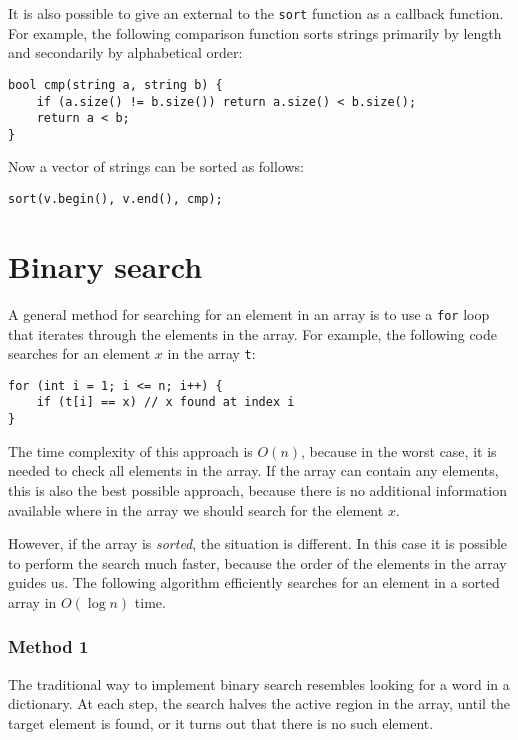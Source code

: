 
It is also possible to give an external
 to the \texttt{sort} function
as a callback function.
For example, the following comparison function
sorts strings primarily by length and secondarily
by alphabetical order:

\begin{lstlisting}
bool cmp(string a, string b) {
    if (a.size() != b.size()) return a.size() < b.size();
    return a < b;
}
\end{lstlisting}
Now a vector of strings can be sorted as follows:
\begin{lstlisting}
sort(v.begin(), v.end(), cmp);
\end{lstlisting}

\section{Binary search}


A general method for searching for an element
in an array is to use a \texttt{for} loop
that iterates through the elements in the array.
For example, the following code searches for
an element $x$ in the array \texttt{t}:

\begin{lstlisting}
for (int i = 1; i <= n; i++) {
    if (t[i] == x) // x found at index i
}
\end{lstlisting}

The time complexity of this approach is $O(n)$,
because in the worst case, it is needed to check
all elements in the array.
If the array can contain any elements,
this is also the best possible approach, because
there is no additional information available where
in the array we should search for the element $x$.

However, if the array is \emph{sorted},
the situation is different.
In this case it is possible to perform the
search much faster, because the order of the
elements in the array guides us.
The following  algorithm
efficiently searches for an element in a sorted array
in $O(\log n)$ time.

\subsubsection{Method 1}

The traditional way to implement binary search
resembles looking for a word in a dictionary.
At each step, the search halves the active region in the array, 
until the target element is found, or it turns out
that there is no such element.

